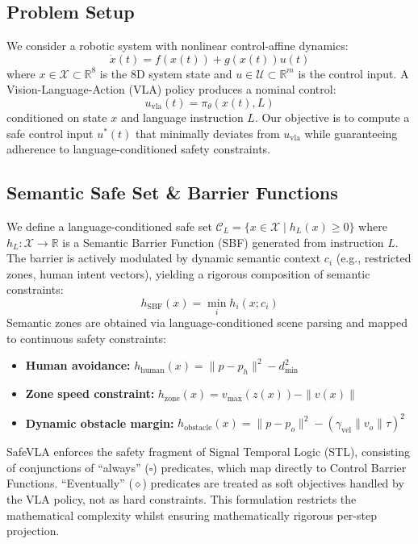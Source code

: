 \documentclass[10pt,twocolumn]{article}
\begin{document}
\subsection{Problem Setup}
We consider a robotic system with nonlinear control-affine dynamics:
\begin{equation}
\dot{x}(t) = f(x(t)) + g(x(t))u(t)
\end{equation}
where $x \in \mathcal{X} \subset \mathbb{R}^8$ is the 8D system state and $u \in \mathcal{U} \subset \mathbb{R}^m$ is the control input. A Vision-Language-Action (VLA) policy produces a nominal control:
\begin{equation}
u_{\text{vla}}(t) = \pi_\theta(x(t), L)
\end{equation}
conditioned on state $x$ and language instruction $L$. Our objective is to compute a safe control input $u^*(t)$ that minimally deviates from $u_{\text{vla}}$ while guaranteeing adherence to language-conditioned safety constraints.

\subsection{Semantic Safe Set \& Barrier Functions}
We define a language-conditioned safe set $\mathcal{C}_L = \{ x \in \mathcal{X} \mid h_L(x) \geq 0 \}$ where $h_L : \mathcal{X} \to \mathbb{R}$ is a Semantic Barrier Function (SBF) generated from instruction $L$.
The barrier is actively modulated by dynamic semantic context $c_i$ (e.g., restricted zones, human intent vectors), yielding a rigorous composition of semantic constraints:
\begin{equation}
h_{\text{SBF}}(x) = \min_i h_i(x; c_i)
\end{equation}
Semantic zones are obtained via language-conditioned scene parsing and mapped to continuous safety constraints:
\begin{itemize}
\item \textbf{Human avoidance:} $h_{\text{human}}(x) = \|p - p_h\|^2 - d_{\min}^2$
\item \textbf{Zone speed constraint:} $h_{\text{zone}}(x) = v_{\max}(z(x)) - \|v(x)\|$
\item \textbf{Dynamic obstacle margin:} $h_{\text{obstacle}}(x) = \|p - p_o\|^2 - (\gamma_\text{vel} \|v_o\| \tau)^2$
\end{itemize}

SafeVLA enforces the safety fragment of Signal Temporal Logic (STL), consisting of conjunctions of ``always'' ($\square$) predicates, which map directly to Control Barrier Functions. ``Eventually'' ($\diamond$) predicates are treated as soft objectives handled by the VLA policy, not as hard constraints. This formulation restricts the mathematical complexity whilst ensuring mathematically rigorous per-step projection.
\end{document}

